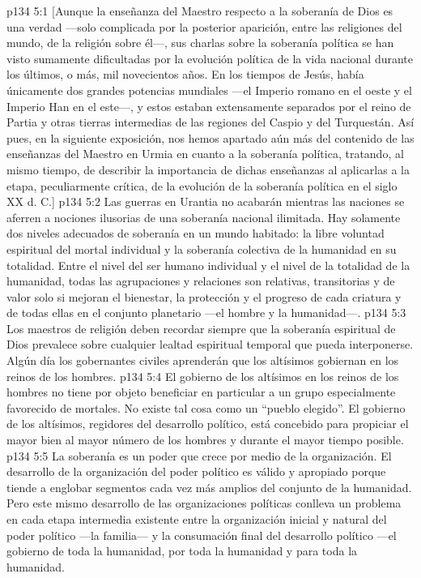 \vs p134 5:1 [Aunque la enseñanza del Maestro respecto a la soberanía de Dios es una verdad ---solo complicada por la posterior aparición, entre las religiones del mundo, de la religión sobre él---, sus charlas sobre la soberanía política se han visto sumamente dificultadas por la evolución política de la vida nacional durante los últimos, o más, mil novecientos años. En los tiempos de Jesús, había únicamente dos grandes potencias mundiales ---el Imperio romano en el oeste y el Imperio Han en el este---, y estos estaban extensamente separados por el reino de Partia y otras tierras intermedias de las regiones del Caspio y del Turquestán. Así pues, en la siguiente exposición, nos hemos apartado aún más del contenido de las enseñanzas del Maestro en Urmia en cuanto a la soberanía política, tratando, al mismo tiempo, de describir la importancia de dichas enseñanzas al aplicarlas a la etapa, peculiarmente crítica, de la evolución de la soberanía política en el siglo XX d. C.]
\vs p134 5:2 \pc Las guerras en Urantia no acabarán mientras las naciones se aferren a nociones ilusorias de una soberanía nacional ilimitada. Hay solamente dos niveles adecuados de soberanía en un mundo habitado: la libre voluntad espiritual del mortal individual y la soberanía colectiva de la humanidad en su totalidad. Entre el nivel del ser humano individual y el nivel de la totalidad de la humanidad, todas las agrupaciones y relaciones son relativas, transitorias y de valor solo si mejoran el bienestar, la protección y el progreso de cada criatura y de todas ellas en el conjunto planetario ---el hombre y la humanidad---.
\vs p134 5:3 Los maestros de religión deben recordar siempre que la soberanía espiritual de Dios prevalece sobre cualquier lealtad espiritual temporal que pueda interponerse. Algún día los gobernantes civiles aprenderán que los altísimos gobiernan en los reinos de los hombres.
\vs p134 5:4 El gobierno de los altísimos en los reinos de los hombres no tiene por objeto beneficiar en particular a un grupo especialmente favorecido de mortales. No existe tal cosa como un “pueblo elegido”. El gobierno de los altísimos, regidores del desarrollo político, está concebido para propiciar el mayor bien al mayor número de  los hombres y durante el mayor tiempo posible.
\vs p134 5:5 La soberanía es un poder que crece por medio de la organización. El desarrollo de la organización del poder político es válido y apropiado porque tiende a englobar segmentos cada vez más amplios del conjunto de la humanidad. Pero este mismo desarrollo de las organizaciones políticas conlleva un problema en cada etapa intermedia existente entre la organización inicial y natural del poder político ---la familia--- y la consumación final del desarrollo político ---el gobierno de toda la humanidad, por toda la humanidad y para toda la humanidad.
